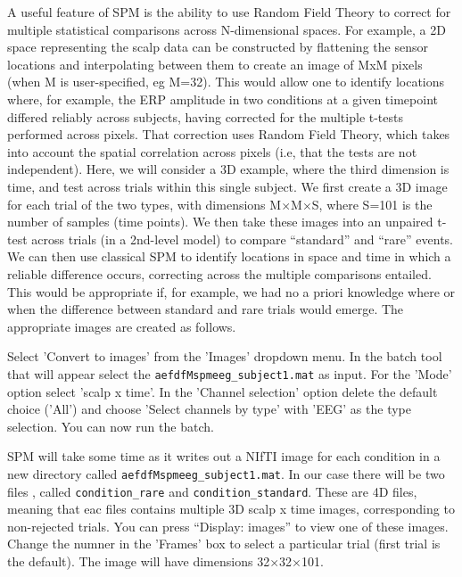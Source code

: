 A useful feature of SPM is the ability to use Random Field Theory to correct for multiple statistical comparisons across N-dimensional spaces. For example, a 2D space representing the scalp data can be constructed by flattening the sensor locations and interpolating between them to create an image of MxM pixels (when M is user-specified, eg M=32). This would allow one to identify locations where, for example, the ERP amplitude in two conditions at a given timepoint differed reliably across subjects, having corrected for the multiple t-tests performed across pixels. That correction uses Random Field Theory, which takes into account the spatial correlation across pixels (i.e, that the tests are not independent). 
Here, we will consider a 3D example, where the third dimension is time, and test across trials within this single subject. We first create a 3D image for each trial of the two types, with dimensions M$\times$M$\times$S, where S=101 is the number of samples (time points). We then take these images into an unpaired t-test across trials (in a 2nd-level model) to compare ``standard'' and ``rare'' events. We can then use classical SPM to identify locations in space and time in which a reliable difference occurs, correcting across the multiple comparisons entailed. This would be appropriate if, for example, we had no a priori knowledge where or when the difference between standard and rare trials would emerge. The appropriate images are created as follows.

Select 'Convert to images' from the 'Images' dropdown menu. In the batch tool that will appear select the  \texttt{aefdfMspmeeg\_subject1.mat} as input. For the 'Mode' option select 'scalp x time'.  In the 'Channel selection' option delete the default choice ('All') and choose 'Select channels by type' with 'EEG' as the type selection. You can now run the batch.

SPM will take some time as it writes out a NIfTI image for each condition in a new directory called \texttt{aefdfMspmeeg\_subject1.mat}. In our case there will be two files ,  called \texttt{condition\_rare} and \texttt{condition\_standard}. These are 4D files, meaning that eac files contains multiple 3D scalp x time images, corresponding to non-rejected trials. You can press ``Display: images'' to view one of these images. Change the numner in the 'Frames' box to select a particular trial  (first trial is the default). The image will have dimensions 32$\times$32$\times$101.

